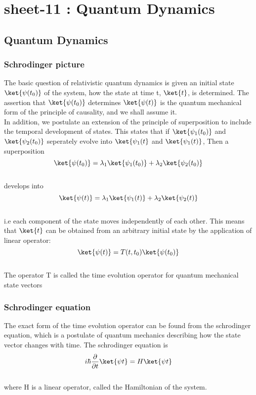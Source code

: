 \chapter{sheet-11 : Quantum Dynamics}

\section{Quantum Dynamics}

\subsection{Schrodinger picture}

The basic question of relativistic quantum dynamics is given an initial state $\ket{\psi(t_0)} $ of the system, how the state at time t, $\ket{t} $, is determined. The assertion that $ \ket{\psi(t_0)}$ determines $\ket{\psi(t)}$ is the quantum mechanical form of the principle of causality, and we shall assume it.\\
In addition, we postulate an extension of the principle of superposition to include the temporal development of states. This states that if $\ket{\psi_1(t_0)}$  and $\ket{\psi_2(t_0)}$ seperately evolve into $\ket{\psi_1(t}$ and $\ket{\psi_1(t)}$, Then a superposition
\[ \ket{\psi(t_0)} = \lambda_1 \ket{\psi_1(t_0)} + \lambda_2 \ket{\psi_2(t_0)}\] \\
develops into \\
\[ \ket{\psi(t)} = \lambda_1 \ket{\psi_1(t)} + \lambda_2 \ket{\psi_2(t)}\]\\
i.e each component of the state moves independently of each other. This means that $\ket{t}$ can be obtained from an arbitrary initial state by the application of linear operator:\\
\[\ket{\psi (t)}= T(t, t_0) \ket{\psi (t_0)}\] \\
The operator T is called the time evolution operator for quantum mechanical state vectors

\subsection{Schrodinger equation}

The exact form of the time evolution operator can be found from the schrodinger equation, which is a postulate of quantum mechanics describing how the state vector changes with time. The schrodinger equation is \\
\[i \hbar \frac{\partial}{\partial t} \ket{\psi t} = H \ket{\psi t} \]\\

where H is a linear operator, called the Hamiltonian of the system.
